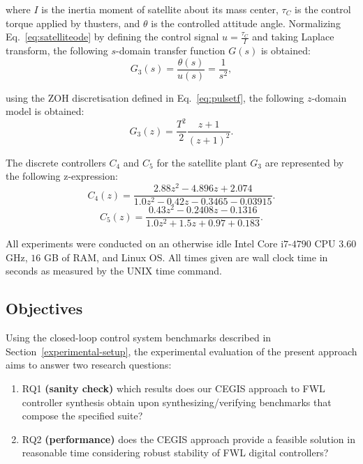 \documentclass{sig-alternate-05-2015}
\begin{document}
\noindent where $I$ is the inertia moment of satellite about its mass center, $\tau_{C}$ is the control 
torque applied by thusters, and $\theta$ is the controlled attitude angle. 
Normalizing Eq.~\eqref{eq:satelliteode} by defining the control signal $u=\frac{\tau_{C}}{I}$ and 
taking Laplace transform, the following $s$-domain transfer function $G(s)$ is obtained:
%
\begin{equation}
\label{eq:satellitetf}
G_{3}(s)=\frac{\theta(s)}{u(s)}=\frac{1}{s^2},
\end{equation}

\noindent using the ZOH discretisation defined in Eq.~\eqref{eq:pulsetf}, 
the following $z$-domain model is obtained:
\begin{equation}
G_{3}(z)= \frac{T^{2}}{2} \frac{z+1}{(z+1)^{2}}.
\end{equation}

The discrete controllers $C_{4}$ and $C_{5}$ for the satellite plant $G_{3}$ 
are represented by the following z-expression:
%
\begin{equation}
\label{satellite-b2}
C_{4}(z)=\frac{2.88z^2 - 4.896z + 2.074}{1.0z^2 - 0.42z - 0.3465 - 0.03915}. \nonumber
\end{equation} 
%
\begin{equation}
\label{satellite-c2}
C_{5}(z)=\frac{0.43z^2 - 0.2408z - 0.1316}{1.0z^2 + 1.5z + 0.97 + 0.183}. \nonumber
\end{equation} 

All experiments were conducted on an otherwise idle Intel Core i$7$-$4790$ 
CPU $3$.$60$ GHz, $16$ GB of RAM, and Linux OS.  All times given are wall 
clock time in seconds as measured by the UNIX time command.

\subsection{Objectives}
\label{experimental-objectives}

Using the closed-loop control system benchmarks described in Section~\ref{experimental-setup}, 
the experimental evaluation of the present approach aims to answer two research questions:
%
\begin{enumerate}
	\item RQ1 \textbf{(sanity check)} which results does our CEGIS approach to FWL controller synthesis 
	obtain upon synthesizing/verifying benchmarks that compose the specified suite?
  \item RQ2 \textbf{(performance)} does the CEGIS approach provide a feasible solution in reasonable time
	considering robust stability of FWL digital controllers?	
\end{enumerate}
\end{document}
